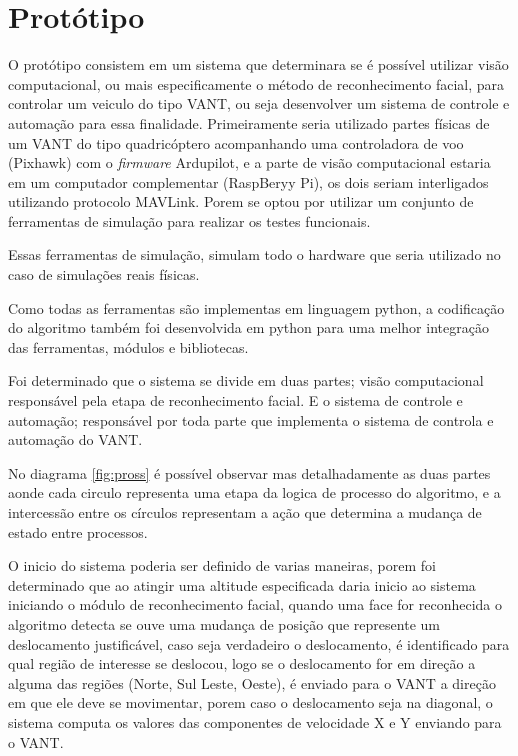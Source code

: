 \section{Protótipo}
O protótipo consistem em um sistema que determinara se é possível utilizar visão computacional, ou mais especificamente o método de reconhecimento facial, para controlar um veiculo do tipo VANT, ou seja desenvolver um sistema de controle e automação para essa finalidade.
Primeiramente seria utilizado partes físicas de um VANT do tipo quadricóptero acompanhando uma controladora de voo (Pixhawk) com o \textit{firmware} Ardupilot, e a parte de visão computacional estaria em um computador complementar (RaspBeryy Pi), os dois seriam interligados utilizando protocolo MAVLink. Porem se optou por utilizar um conjunto de ferramentas de simulação para realizar os testes funcionais.

Essas ferramentas de simulação, simulam todo o hardware que seria utilizado no caso de simulações reais físicas. 

Como todas as ferramentas são implementas em linguagem python, a codificação do algoritmo também foi desenvolvida em python para uma melhor integração das ferramentas, módulos e bibliotecas.

Foi determinado que o sistema se divide em duas partes; visão computacional responsável pela etapa de reconhecimento facial. E o sistema de controle e automação; responsável por toda parte que implementa o sistema de controla e automação do VANT.

No diagrama \ref{fig:pross} é possível observar mas detalhadamente as duas partes aonde cada circulo representa uma etapa da logica de processo do algoritmo, e a intercessão entre os círculos representam a ação que determina a mudança de estado entre processos.

O inicio do sistema poderia ser definido de varias maneiras, porem foi determinado que ao atingir uma altitude especificada daria inicio ao sistema iniciando o módulo de reconhecimento facial, quando uma face for reconhecida o algoritmo detecta se ouve uma mudança de posição que represente um deslocamento justificável, caso seja verdadeiro o deslocamento, é identificado para qual região de interesse se deslocou, logo se o deslocamento for em direção a alguma das regiões (Norte, Sul Leste, Oeste), é enviado para o VANT a direção em que ele deve se movimentar, porem caso o deslocamento seja na diagonal, o sistema computa os valores das componentes de velocidade X e Y enviando para o VANT.   
 
